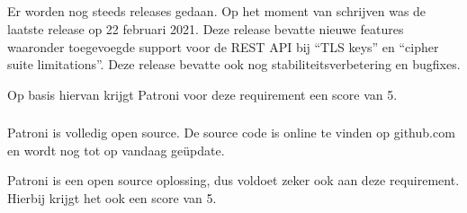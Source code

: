 \subsection{}
\label{subsec:Should have}



\subsubsection{}
\label{subsubsec:Actieve ondersteuning in 2020-2021}

Er worden nog steeds releases gedaan. Op het moment van schrijven was de laatste release op 22 februari 2021. Deze release bevatte nieuwe features waaronder toegevoegde support voor de REST API bij “TLS keys” en “cipher suite limitations”. Deze release bevatte ook nog stabiliteitsverbetering en bugfixes.

Op basis hiervan krijgt Patroni voor deze requirement een score van 5.

\subsubsection{}
\label{subsubsec:Open source}

Patroni is volledig open source. De source code is online te vinden op github.com en wordt nog tot op vandaag geüpdate.

Patroni is een open source oplossing, dus voldoet zeker ook aan deze requirement. Hierbij krijgt het ook een score van 5.

\subsection{}
\label{subsec:Could have}


